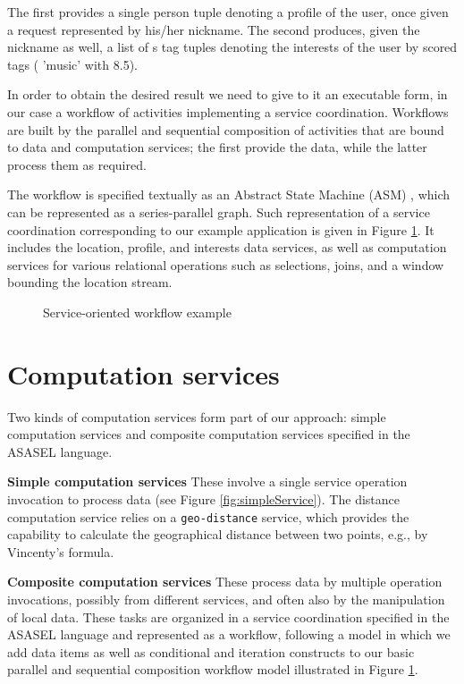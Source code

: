 \documentclass{acm_proc_article-sp}
\begin{document}
	
The first provides a single person tuple denoting a profile of the user, once given a request represented by his/her nickname. The second produces, given the nickname as well, a list of s tag tuples denoting the interests of the user by scored tags (\eg{} 'music' with 8.5).
	
In order to obtain the desired result we need to give to it an executable form, in our case a workflow of activities implementing a service coordination. Workflows are built by the parallel and sequential composition of activities that are bound to data and computation services; the first provide the data, while the latter process them as required.
	
The workflow is specified textually as an Abstract State Machine (ASM) \cite{Gurevich1995}, which can be represented as a series-parallel graph. Such representation of a service coordination corresponding to our example application is given in Figure \ref{fig:servCoorExample}. It includes the location, profile, and interests data services, as well as computation services for various relational operations such as selections, joins, and a window bounding the location stream.
		
\begin{figure}
	\centering
		\caption{Service-oriented workflow example}
		\label{fig:servCoorExample}
\end{figure}
	
		
\section{Computation services}\label{sec:asasel:computationServices}

Two kinds of computation services form part of our approach: simple computation services and composite computation services specified in the ASASEL language.
	
\textbf{Simple computation services} These involve a single service operation invocation to process data (see Figure \ref{fig:simpleService}). The distance computation service relies on a \texttt{geo-distance} service, which provides the capability to calculate the geographical distance between two points, e.g., by Vincenty's formula.

\textbf{Composite computation services} These process data by multiple operation invocations, possibly from different services, and often also by the manipulation of local data. These tasks are organized in a service coordination specified in the ASASEL language and represented as a workflow, following a model in which we add data items as well as conditional and iteration constructs to our basic parallel and sequential composition workflow model illustrated in Figure \ref{fig:servCoorExample}.
		
\end{document}
